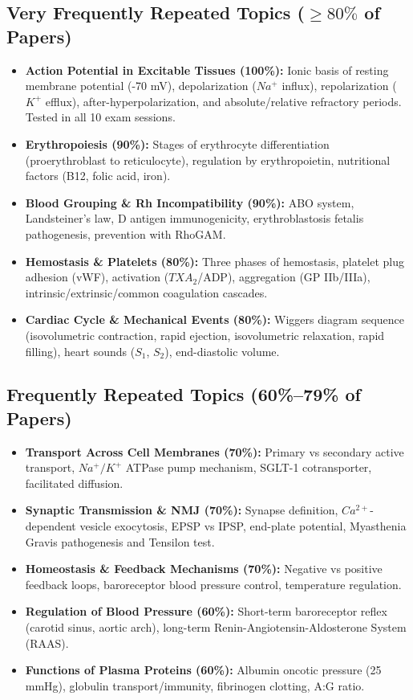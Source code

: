 \documentclass[11pt,a4paper]{article}
\begin{document}
\subsection{Very Frequently Repeated Topics ($\ge 80\%$ of Papers)}
\begin{itemize}[leftmargin=*]
    \item \textbf{Action Potential in Excitable Tissues (100\%):} Ionic basis of resting membrane potential (-70 mV), depolarization ($Na^+$ influx), repolarization ($K^+$ efflux), after-hyperpolarization, and absolute/relative refractory periods. Tested in all 10 exam sessions.
    \item \textbf{Erythropoiesis (90\%):} Stages of erythrocyte differentiation (proerythroblast to reticulocyte), regulation by erythropoietin, nutritional factors (B12, folic acid, iron).
    \item \textbf{Blood Grouping \& Rh Incompatibility (90\%):} ABO system, Landsteiner's law, D antigen immunogenicity, erythroblastosis fetalis pathogenesis, prevention with RhoGAM.
    \item \textbf{Hemostasis \& Platelets (80\%):} Three phases of hemostasis, platelet plug adhesion (vWF), activation ($TXA_2$/ADP), aggregation (GP IIb/IIIa), intrinsic/extrinsic/common coagulation cascades.
    \item \textbf{Cardiac Cycle \& Mechanical Events (80\%):} Wiggers diagram sequence (isovolumetric contraction, rapid ejection, isovolumetric relaxation, rapid filling), heart sounds ($S_1$, $S_2$), end-diastolic volume.
\end{itemize}

\subsection{Frequently Repeated Topics (60\%--79\% of Papers)}
\begin{itemize}[leftmargin=*]
    \item \textbf{Transport Across Cell Membranes (70\%):} Primary vs secondary active transport, $Na^+/K^+$ ATPase pump mechanism, SGLT-1 cotransporter, facilitated diffusion.
    \item \textbf{Synaptic Transmission \& NMJ (70\%):} Synapse definition, $Ca^{2+}$-dependent vesicle exocytosis, EPSP vs IPSP, end-plate potential, Myasthenia Gravis pathogenesis and Tensilon test.
    \item \textbf{Homeostasis \& Feedback Mechanisms (70\%):} Negative vs positive feedback loops, baroreceptor blood pressure control, temperature regulation.
    \item \textbf{Regulation of Blood Pressure (60\%):} Short-term baroreceptor reflex (carotid sinus, aortic arch), long-term Renin-Angiotensin-Aldosterone System (RAAS).
    \item \textbf{Functions of Plasma Proteins (60\%):} Albumin oncotic pressure (25 mmHg), globulin transport/immunity, fibrinogen clotting, A:G ratio.
\end{itemize}
\end{document}
